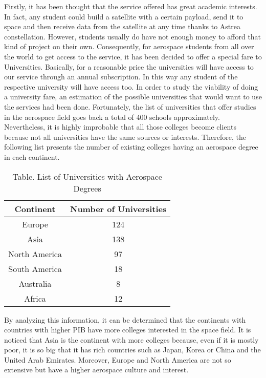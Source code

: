 Firstly, it has been thought that the service offered has great academic interests. In fact, any student could build a satellite with a certain payload, send it to space and then receive data from the satellite at any time thanks to Astrea constellation. However, students usually do have not enough money to afford that kind of project on their own. Consequently, for aerospace students from all over the world to get access to the service, it has been decided to offer a special fare to Universities.  Basically, for a reasonable price the universities will have access to our service through an annual subscription. In this way any student of the respective university will have access too.
\newline
\newline
In order to study the viability of doing a university fare, an estimation of the possible universities that would want to use the services had been done. Fortunately, the list of universities that offer studies in the aerospace field goes back a total of 400 schools approximately. Nevertheless, it is highly improbable that all those colleges become clients because not all universities have the same sources or interests. Therefore, the following list presents the number of existing colleges having an aerospace degree in each continent.
\newline
\newline	
	\begin{table}[!h]
	\begin{center}
	\begin{tabular}{|c|c|}
	\bf{Continent} & \bf{Number of Universities}\\
	\hline 
	Europe & 124\\
	\hline 
	Asia & 138\\
	\hline 
	North America &  97\\
	\hline
	 South America & 18\\
	\hline 
	Australia & 8\\
	\hline 
	Africa & 12\\
	\end{tabular}
	\end{center}
	\caption{Table. List of Universities with Aerospace Degrees}
	\end{table} 	
\newline
\newline
By analyzing this information, it can be determined that the continents with countries with higher PIB have more colleges interested in the space field. It is noticed that Asia is the continent with more colleges because, even if it is mostly poor, it is so big that it has rich countries such as Japan, Korea or China and the United Arab Emirates. Moreover, Europe and North America are not so extensive but have a higher aerospace culture and interest. 
